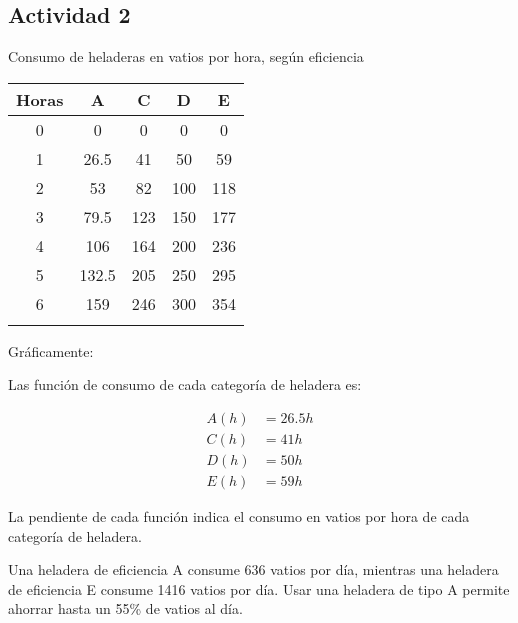 \subsection*{Actividad 2}

\begin{center}
Consumo de heladeras en vatios por hora, según eficiencia\\
\vspace{4mm}
\begin{tabular}{ccccc}
Horas & A     & C   & D   & E   \\ \hline
0     & 0     & 0   & 0   & 0   \\
1     & 26.5  & 41  & 50  & 59  \\
2     & 53    & 82  & 100 & 118 \\
3     & 79.5  & 123 & 150 & 177 \\
4     & 106   & 164 & 200 & 236 \\
5     & 132.5 & 205 & 250 & 295 \\
6     & 159   & 246 & 300 & 354 \\ \hline
\vspace{5mm}
\end{tabular}
\end{center}

Gráficamente:

\begin{center}
\end{center}

Las función de consumo de cada categoría de heladera es:

\begin{align*}
	A(h) &= 26.5h\\ 
	C(h) &= 41h\\ 
	D(h) &= 50h\\ 
	E(h) &= 59h
\end{align*}

La pendiente de cada función indica el consumo en vatios por hora de cada categoría de heladera.

Una heladera de eficiencia A consume 636 vatios por día, mientras una heladera de eficiencia E consume 1416 vatios por día. Usar una heladera de tipo A permite ahorrar hasta un 55\% de vatios al día.

